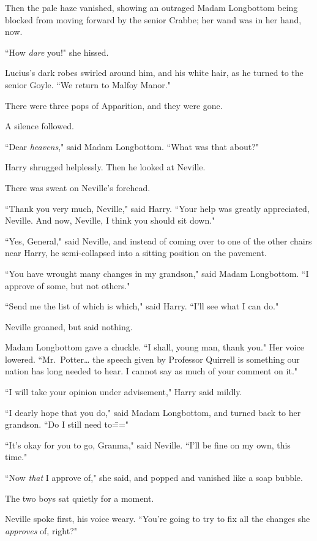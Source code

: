 Then the pale haze vanished, showing an outraged Madam Longbottom being blocked from moving forward by the senior Crabbe; her wand was in her hand, now.

``How \emph{dare} you!" she hissed.

Lucius's dark robes swirled around him, and his white hair, as he turned to the senior Goyle. ``We return to Malfoy Manor."

There were three pops of Apparition, and they were gone.

A silence followed.

``Dear \emph{heavens}," said Madam Longbottom. ``What was that about?"

Harry shrugged helplessly. Then he looked at Neville.

There was sweat on Neville's forehead.

``Thank you very much, Neville," said Harry. ``Your help was greatly appreciated, Neville. And now, Neville, I think you should sit down."

``Yes, General," said Neville, and instead of coming over to one of the other chairs near Harry, he semi-collapsed into a sitting position on the pavement.

``You have wrought many changes in my grandson," said Madam Longbottom. ``I approve of some, but not others."

``Send me the list of which is which," said Harry. ``I'll see what I can do."

Neville groaned, but said nothing.

Madam Longbottom gave a chuckle. ``I shall, young man, thank you." Her voice lowered. ``Mr.~Potter{\ldots} the speech given by Professor Quirrell is something our nation has long needed to hear. I cannot say as much of your comment on it."

``I will take your opinion under advisement," Harry said mildly.

``I dearly hope that you do," said Madam Longbottom, and turned back to her grandson. ``Do I still need to\==="

``It's okay for you to go, Granma," said Neville. ``I'll be fine on my own, this time."

``Now \emph{that} I approve of," she said, and popped and vanished like a soap bubble.

The two boys sat quietly for a moment.

Neville spoke first, his voice weary. ``You're going to try to fix all the changes she \emph{approves} of, right?"

